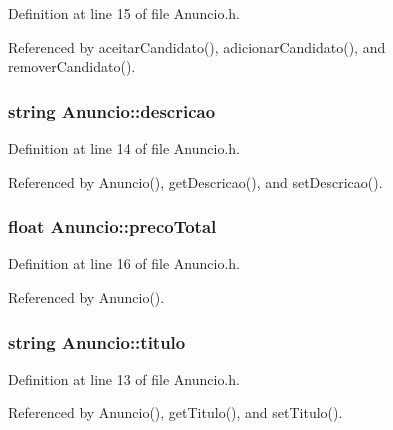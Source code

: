 Definition at line 15 of file Anuncio.\+h.



Referenced by aceitar\+Candidato(), adicionar\+Candidato(), and remover\+Candidato().

\hypertarget{class_anuncio_aa6a9eb8d08cb06d16061b006eb2c8b97}{
\subsubsection[{descricao}]{\setlength{\rightskip}{0pt plus 5cm}string Anuncio\+::descricao\hspace{0.3cm}{\ttfamily [private]}}}\label{class_anuncio_aa6a9eb8d08cb06d16061b006eb2c8b97}


Definition at line 14 of file Anuncio.\+h.



Referenced by Anuncio(), get\+Descricao(), and set\+Descricao().

\hypertarget{class_anuncio_a8ba7cc797b8b582c596038a17e9bce3b}{
\subsubsection[{preco\+Total}]{\setlength{\rightskip}{0pt plus 5cm}float Anuncio\+::preco\+Total\hspace{0.3cm}{\ttfamily [private]}}}\label{class_anuncio_a8ba7cc797b8b582c596038a17e9bce3b}


Definition at line 16 of file Anuncio.\+h.



Referenced by Anuncio().

\hypertarget{class_anuncio_adb34bedd8220f42b9ee37662c21313e6}{
\subsubsection[{titulo}]{\setlength{\rightskip}{0pt plus 5cm}string Anuncio\+::titulo\hspace{0.3cm}{\ttfamily [private]}}}\label{class_anuncio_adb34bedd8220f42b9ee37662c21313e6}


Definition at line 13 of file Anuncio.\+h.



Referenced by Anuncio(), get\+Titulo(), and set\+Titulo().

